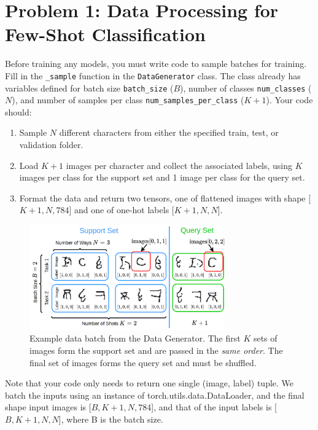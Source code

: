 \documentclass[12pt]{article}
\begin{document}
\section*{Problem 1: Data Processing for Few-Shot Classification}

Before training any models, you must write code to sample batches for training. Fill in the \texttt{\_sample} function in the \texttt{DataGenerator} class. The class already has variables defined for batch size \texttt{batch\_size} ($B$), number of classes \texttt{num\_classes} ($N$), and number of samples per class \texttt{num\_samples\_per\_class} ($K+1$). Your code should:
\begin{enumerate}
    \item Sample $N$ different characters from either the specified train, test, or validation folder.
    \item Load $K+1$ images per character and collect the associated labels, using $K$ images per class for the support set and 1 image per class for the query set.
    \item Format the data and return two tensors, one of flattened images with shape [$K+1, N, 784$] and one of one-hot labels [$K+1, N, N$].
\end{enumerate}  

\begin{figure}
    \centering
    \includegraphics[width = 0.75\textwidth]{figures/hw1_batch_v4.png}
    \vspace{-0.3cm}
    \caption{\small Example data batch from the Data Generator. The first $K$ sets of images form the support set and are passed in the \emph{same order}. The final set of images forms the query set and must be shuffled.}
    \label{fig:batch}
\end{figure}
Note that your code only needs to return one single (image, label) tuple. We batch the inputs using an instance of torch.utils.data.DataLoader, and the final shape input images is [$B, K+1, N, 784$], and that of the input labels is [$B, K+1, N, N$], where B is the batch size.
\end{document}
